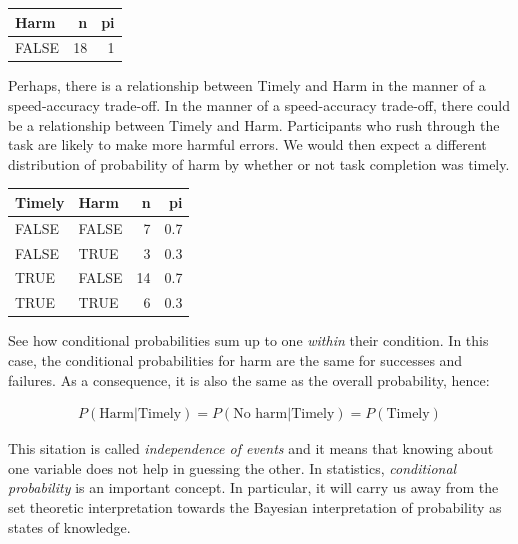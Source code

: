 \documentclass[]{svmono}
\newenvironment{Shaded}{\begin{snugshade}}{\end{snugshade}}
\newcommand{\KeywordTok}[1]{\textcolor[rgb]{0.13,0.29,0.53}{\textbf{#1}}}
\newcommand{\DataTypeTok}[1]{\textcolor[rgb]{0.13,0.29,0.53}{#1}}
\newcommand{\StringTok}[1]{\textcolor[rgb]{0.31,0.60,0.02}{#1}}
\newcommand{\OperatorTok}[1]{\textcolor[rgb]{0.81,0.36,0.00}{\textbf{#1}}}
\newcommand{\NormalTok}[1]{#1}
\begin{document}
\begin{tabular}{l|r|r}
\hline
Harm & n & pi\\
\hline
FALSE & 18 & 1\\
\hline
\end{tabular}

Perhaps, there is a relationship between Timely and Harm in the manner
of a speed-accuracy trade-off. In the manner of a speed-accuracy
trade-off, there could be a relationship between Timely and Harm.
Participants who rush through the task are likely to make more harmful
errors. We would then expect a different distribution of probability of
harm by whether or not task completion was timely.

\begin{Shaded}
\end{Shaded}

\begin{tabular}{l|l|r|r}
\hline
Timely & Harm & n & pi\\
\hline
FALSE & FALSE & 7 & 0.7\\
\hline
FALSE & TRUE & 3 & 0.3\\
\hline
TRUE & FALSE & 14 & 0.7\\
\hline
TRUE & TRUE & 6 & 0.3\\
\hline
\end{tabular}

See how conditional probabilities sum up to one \emph{within} their
condition. In this case, the conditional probabilities for harm are the
same for successes and failures. As a consequence, it is also the same
as the overall probability, hence:

\[\begin{aligned}
P(\textrm{Harm} | \textrm{Timely}) = P(\textrm{No harm} | \textrm{Timely}) =
P(\textrm{Timely})
\end{aligned}\]

This sitation is called \emph{independence of events} and it means that
knowing about one variable does not help in guessing the other. In
statistics, \emph{conditional probability} is an important concept. In
particular, it will carry us away from the set theoretic interpretation
towards the Bayesian interpretation of probability as states of
knowledge.
\end{document}
